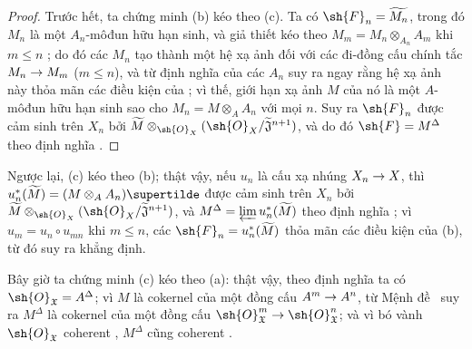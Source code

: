 \documentclass[oneside]{amsart}
\makeatletter
\renewcommand{\leq}{\leqslant}
\newcommand{\ega@arrow}[2]{\mathchoice{#1}{#2}{#2}{#2}}
\renewcommand{\to}{\ega@arrow{\longrightarrow}{\rightarrow}}
\newcommand{\oldpage}[2][]{{\marginnote{\normalfont\textbf{#1}~|~#2}}\ignorespaces}
\makeatother
\begin{document}
\begin{proof}
Trước hết, ta chứng minh (b) kéo theo (c).
Ta có $\sh{F}_n=\widetilde{M_n}$, trong đó $M_n$ là một $A_n$-môđun hữu hạn sinh, và giả thiết kéo theo $M_m=M_n\otimes_{A_n}A_m$ khi $m\leq n$ ; do đó các $M_n$ tạo thành một hệ xạ ảnh đối với các đi-đồng cấu chính tắc $M_n\to M_m$ ($m\leq n$), và từ định nghĩa của các $A_n$ suy ra ngay rằng hệ xạ ảnh này thỏa mãn các điều kiện của ; vì thế, giới hạn xạ ảnh $M$ của nó là một $A$-môđun hữu hạn sinh sao cho $M_n=M\otimes_A A_n$ với mọi $n$.
Suy ra $\sh{F}_n$ được cảm sinh trên $X_n$ bởi $\widetilde{M}\otimes_{\sh{O}_X}(\sh{O}_X/\widetilde{\mathfrak{J}}^{n+1})$, và do đó $\sh{F}=M^\Delta$ theo định nghĩa .
\end{proof}

Ngược lại, (c) kéo theo (b); thật vậy, nếu $u_n$ là cấu xạ nhúng $X_n\to X$, thì $u_n^*(\widetilde{M})=(M\otimes_A A_n)\supertilde$ được cảm sinh trên $X_n$ bởi $\widetilde{M}\otimes_{\sh{O}_X}(\sh{O}_X/\widetilde{\mathfrak{J}}^{n+1})$, và $M^\Delta=\varprojlim u_n^*(\widetilde{M})$ theo định nghĩa ; vì $u_m=u_n\circ u_{mn}$ khi $m\leq n$, các $\sh{F}_n=u_n^*(\widetilde{M})$ thỏa mãn các điều kiện của (b), từ đó suy ra khẳng định.

Bây giờ ta chứng minh (c) kéo theo (a): thật vậy, theo định nghĩa ta có $\sh{O}_\mathfrak{X}=A^\Delta$; vì $M$ là cokernel của một đồng cấu $A^m\to A^n$, từ Mệnh đề~ suy ra $M^\Delta$ là cokernel của một đồng cấu $\sh{O}_\mathfrak{X}^m\to\sh{O}_\mathfrak{X}^n$; và vì bó vành $\sh{O}_\mathfrak{X}$ coherent , $M^\Delta$ cũng coherent .
\oldpage[I]{203}
\end{document}
